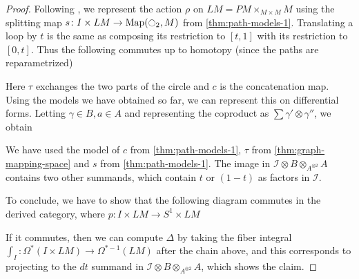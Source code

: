 \documentclass{scrartcl}
\theoremstyle{plain}
\theoremstyle{definition}
\DeclareMathOperator{\Map}{Map}
\begin{document}
\begin{proof}
Following \cite{naef2019string}, we represent the action $\rho$ on $LM = PM\times_{M\times M} M$ using the splitting map $s\colon I \times LM\to\Map(\ocircle_2, M)$ from \cref{thm:path-models-1}. Translating a loop by $t$ is the same as composing its restriction to $[t, 1]$ with its restriction to $[0, t]$. Thus the following commutes up to homotopy (since the paths are reparametrized)

\begin{center}
\end{center}
Here $\tau$ exchanges the two parts of the circle and $c$ is the concatenation map. Using the models we have obtained so far, we can represent this on differential forms. Letting $\gamma\in B, a\in A$ and representing the coproduct as $\sum \gamma'\otimes\gamma''$, we obtain 

\begin{center}
\end{center}

We have used the model of $c$ from \cref{thm:path-models-1}, $\tau$ from \cref{thm:graph-mapping-space} and $s$ from \cref{thm:path-models-1}. The image in $\mathcal I \otimes B\otimes_{A^{\otimes 2}} A$ contains two other summands, which contain $t$ or $(1-t)$ as factors in $\mathcal I$. 

To conclude, we have to show that the following diagram commutes in the derived category, where $p\colon I\times LM\to S^1 \times LM$
\begin{center}
\end{center}
If it commutes, then we can compute $\Delta$ by taking the fiber integral $\int_{I}\colon\Omega^*(I\times LM)\to \Omega^{*-1}(LM)$ after the chain above, and this corresponds to projecting to the $dt$ summand in $\mathcal I\otimes B\otimes_{A^{\otimes 2}} A$, which shows the claim.


\end{proof}
\end{document}
